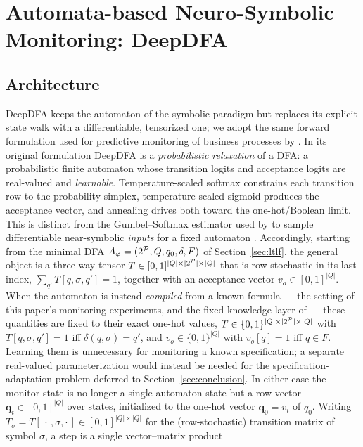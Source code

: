 \section{Automata-based Neuro-Symbolic Monitoring: DeepDFA}
\label{sec:deepdfa}

\subsection{Architecture}
\label{sec:deepdfa-arch}

DeepDFA \cite{deepdfa_ecai2024} keeps the automaton of the symbolic paradigm but replaces its explicit state walk with a differentiable, tensorized one; we adopt the same forward formulation used for predictive monitoring of business processes by \cite{mezini2025neuro}. In its original formulation DeepDFA is a \emph{probabilistic relaxation} of a DFA: a probabilistic finite automaton whose transition logits and acceptance logits are real-valued and \emph{learnable}. Temperature-scaled softmax constrains each transition row to the probability simplex, temperature-scaled sigmoid produces the acceptance vector, and annealing drives both toward the one-hot/Boolean limit. This is distinct from the Gumbel--Softmax estimator used by \cite{mezini2025neuro} to sample differentiable near-symbolic \emph{inputs} for a fixed automaton \cite{gumb_sftmx_1,gumb_sftmx_2}. Accordingly, starting from the minimal DFA $A_\varphi = (2^{\mathcal{P}}, Q, q_0, \delta, F)$ of Section~\ref{sec:ltlf}, the general object is a three-way tensor $T \in [0,1]^{|Q| \times |2^{\mathcal{P}}| \times |Q|}$ that is row-stochastic in its last index, $\sum_{q'} T[q, \sigma, q'] = 1$, together with an acceptance vector $v_o \in [0,1]^{|Q|}$. When the automaton is instead \emph{compiled} from a known \ltlf formula --- the setting of this paper's monitoring experiments, and the fixed knowledge layer of \cite{mezini2025neuro} --- these quantities are fixed to their exact one-hot values, $T \in \{0,1\}^{|Q| \times |2^{\mathcal{P}}| \times |Q|}$ with $T[q, \sigma, q'] = 1$ iff $\delta(q, \sigma) = q'$, and $v_o \in \{0,1\}^{|Q|}$ with $v_o[q] = 1$ iff $q \in F$. Learning them is unnecessary for monitoring a known specification; a separate real-valued parameterization would instead be needed for the specification-adaptation problem deferred to Section~\ref{sec:conclusion}. In either case the monitor state is no longer a single automaton state but a row vector $\mathbf{q}_t \in [0,1]^{|Q|}$ over states, initialized to the one-hot vector $\mathbf{q}_0 = v_i$ of $q_0$. Writing $T_\sigma = T[\,\cdot\,, \sigma, \cdot\,] \in [0,1]^{|Q| \times |Q|}$ for the (row-stochastic) transition matrix of symbol $\sigma$, a step is a single vector--matrix product
